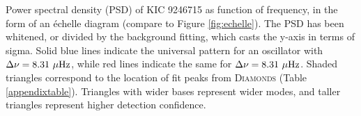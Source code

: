\label{fig:appendixfig}
Power spectral density (PSD) of KIC 9246715 as function of frequency, in the form of an \'echelle diagram (compare to Figure \ref{fig:echelle}). The PSD has been whitened, or divided by the background fitting, which casts the y-axis in terms of sigma. Solid blue lines indicate the universal pattern for an oscillator with $\Delta \nu = 8.31 \ \mu \rm{Hz}$, while red lines indicate the same for $\Delta \nu = 8.31 \ \mu \rm{Hz}$. Shaded triangles correspond to the location of fit peaks from \textsc{D\large{iamonds}} (Table \ref{appendixtable}). Triangles with wider bases represent wider modes, and taller triangles represent higher detection confidence.